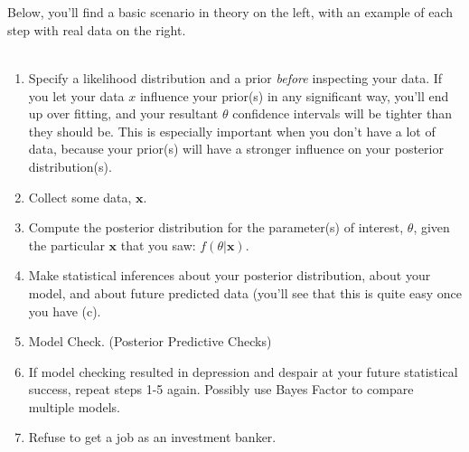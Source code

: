 \documentclass[12pt]{book}
\begin{document}
\\\\
Below, you'll find a basic scenario in theory on the left, with an example of each step with real data on the right.
\\\\
\twocolumn 
\begin{enumerate}
\item Specify a likelihood distribution and a prior \textit{before} inspecting your data. If you let your data $x$ influence your prior(s) in any significant way, you'll end up over fitting, and your resultant $\theta$ confidence intervals will be tighter than they should be. This is especially important when you don't have a lot of data, because your prior(s) will have a stronger influence on your posterior distribution(s).
\item Collect some data, $\textbf{x}$.
\item Compute the posterior distribution for the parameter(s) of interest, $\theta$, given the particular $\textbf{x}$ that you saw: $f(\theta|\textbf{x})$.
\item Make statistical inferences about your posterior distribution, about your model, and about future predicted data (you'll see that this is quite easy once you have (c).
\item Model Check. (Posterior Predictive Checks)
\item If model checking resulted in depression and despair at your future statistical success, repeat steps 1-5 again. Possibly use Bayes Factor to compare multiple models.
\item Refuse to get a job as an investment banker.
\end{enumerate}
{\color{blue}{
\begin{enumerate}
\item 
\item 
\item 
\item 
\item 
\item 
\end{enumerate}
}}
\newpage

\onecolumn
\end{document}
